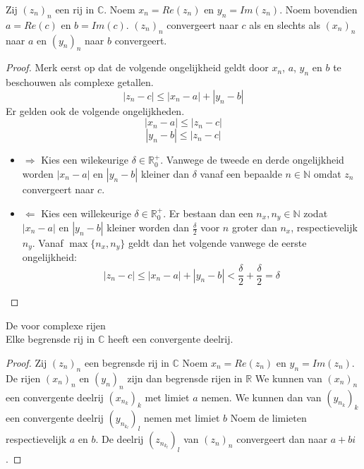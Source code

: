 \documentclass[main.tex]{subfiles}
\begin{document}
\begin{pr}
  \label{pr:complexe-limiet-splitsen}
  Zij $(z_{n})_{n}$ een rij in $\mathbb{C}$.
  Noem $x_{n} = Re(z_{n})$ en $y_{n} = Im(z_{n})$.
  Noem bovendien $a=Re(c)$ en $b=Im(c)$.
  $(z_{n})_{n}$ convergeert naar $c$ als en slechts als $(x_{n})_{n}$ naar $a$ en $(y_{n})_{n}$ naar $b$ convergeert.

  \begin{proof}
    Merk eerst op dat de volgende ongelijkheid geldt door $x_{n}$, $a$, $y_{n}$ en $b$ te beschouwen als complexe getallen.
    \[ |z_{n}-c| \le |x_{n}-a| + |y_{n}-b| \]
    Er gelden ook de volgende ongelijkheden.
    \[ |x_{n}-a| \le |z_{n}-c| \]
    \[ |y_{n}-b| \le |z_{n}-c| \]
    \begin{itemize}
    \item $\Rightarrow$
      Kies een wilekeurige $\delta \in \mathbb{R}_{0}^{+}$.
      Vanwege de tweede en derde ongelijkheid worden $|x_{n}-a|$ en $|y_{n}-b|$ kleiner dan $\delta$ vanaf een bepaalde $n\in \mathbb{N}$ omdat $z_{n}$ convergeert naar $c$.
    \item $\Leftarrow$
      Kies een willekeurige $\delta \in \mathbb{R}_{0}^{+}$.
      Er bestaan dan een $n_{x},n_{y}\in \mathbb{N}$ zodat $|x_{n}-a|$ en $|y_{n}-b|$ kleiner worden dan $\frac{\delta}{2}$ voor $n$ groter dan $n_{x}$, respectievelijk $n_{y}$.
      Vanaf $\max\{n_{x},n_{y}\}$ geldt dan het volgende vanwege de eerste ongelijkheid:
      \[ |z_{n}-c| \le |x_{n}-a| + |y_{n}-b| < \frac{\delta}{2}+\frac{\delta}{2} = \delta \]
    \end{itemize}
  \end{proof}
\end{pr}

\begin{st}
  \label{st:bolzano-complexe-rijen}
  De  voor complexe rijen\\
  Elke begrensde rij in $\mathbb{C}$ heeft een convergente deelrij.

  \begin{proof}
    Zij $(z_{n})_{n}$ een begrensde rij in $\mathbb{C}$
    Noem $x_{n} = Re(z_{n})$ en $y_{n} = Im(z_{n})$.
    De rijen $(x_{n})_{n}$ en $(y_{n})_{n}$ zijn dan begrensde rijen in $\mathbb{R}$
    We kunnen van $(x_{n})_{n}$ een convergente deelrij $(x_{n_{k}})_{k}$ met limiet $a$ nemen.
    We kunnen dan van $(y_{n_{k}})_{k}$ een convergente deelrij $(y_{n_{k_{l}}})_{l}$ nemen met limiet $b$
    Noem de limieten respectievelijk $a$ en $b$.
    De deelrij $(z_{n_{k_{l}}})_{l}$ van $(z_{n})_{n}$ convergeert dan naar $a+bi$.
  \end{proof}
\end{st}
\end{document}
